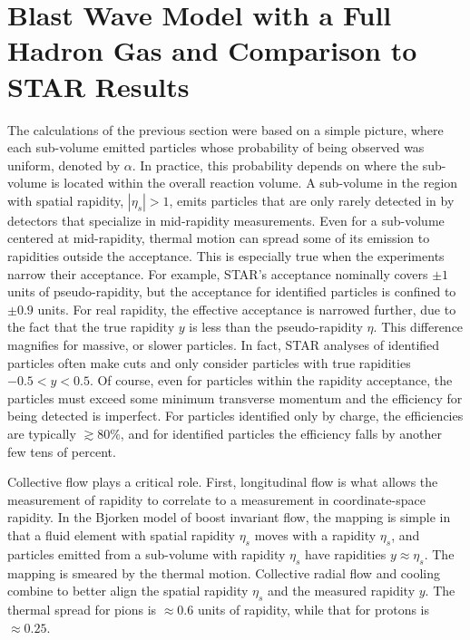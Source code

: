 
\section{Blast Wave Model with a Full Hadron Gas and Comparison to STAR Results}\label{sec:blast}

The calculations of the previous section were based on a simple picture, where each sub-volume emitted particles whose probability of being observed was uniform, denoted by $\alpha$. In practice, this probability depends on where the sub-volume is located within the overall reaction volume. A sub-volume in the region with spatial rapidity, $|\eta_s|>1$, emits particles that are only rarely detected in by detectors that specialize in mid-rapidity measurements. Even for a sub-volume centered at mid-rapidity, thermal motion can spread some of its emission to rapidities outside the acceptance. This is especially true when the experiments narrow their acceptance. For example, STAR's acceptance nominally covers $\pm 1$ units of pseudo-rapidity, but the acceptance for identified particles is confined to $\pm 0.9$ units. For real rapidity, the effective acceptance is narrowed further, due to the fact that the true rapidity $y$ is less than the pseudo-rapidity $\eta$. This difference magnifies for massive, or slower particles. In fact, STAR analyses of identified particles often make cuts and only consider particles with true rapidities $-0.5<y<0.5$. Of course, even for particles within the rapidity acceptance, the particles must exceed some minimum transverse momentum and the efficiency for being detected is imperfect. For particles identified only by charge, the efficiencies are typically $\gtrsim 80\%$, and for identified particles the efficiency falls by another few tens of percent.

Collective flow plays a critical role. First, longitudinal flow is what allows the measurement of rapidity to correlate to a measurement in coordinate-space rapidity. In the Bjorken model of boost invariant flow, the mapping is simple in that a fluid element with spatial rapidity $\eta_s$ moves with a rapidity $\eta_s$, and particles emitted from a sub-volume with rapidity $\eta_s$ have rapidities $y\approx\eta_s$. The mapping is smeared by the thermal motion. Collective radial flow and cooling combine to better align the spatial rapidity $\eta_s$ and the measured rapidity $y$. The thermal spread for pions is $\approx 0.6$ units of rapidity, while that for protons is $\approx 0.25$.

